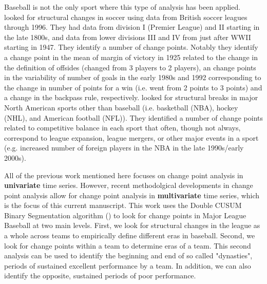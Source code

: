 \documentclass[USenglish]{article}
\theoremstyle{dgthm}
\theoremstyle{dgdef}
\begin{document}
Baseball is not the only sport where this type of analysis has been applied.  \cite{PalaciosHuerta2004} looked for structural changes in soccer using data from British soccer leagues through 1996.  They had data from division I (Premier League) and II starting in the late 1800s, and data from lower divisions III and IV from just after WWII starting in 1947.  They identify a number of change points.  Notably they identify a change point in the mean of margin of victory in 1925 related to the change in the definition of offsides (changed from 3 players to 2 players), an change points in the variability of number of goals in the early 1980s and 1992 corresponding to the change in number of points for a win (i.e. went from 2 points to 3 points) and a change in the backpass rule, respectively.  \cite{FortLee2007} looked for structural breaks in major North American sports other than baseball (i.e. basketball (NBA), hockey (NHL), and American football (NFL)).  They identified a number of change points related to competitive balance in each sport that often, though not always, correspond to league expansion, league mergers, or other major events in a sport (e.g. increased number of foreign players in the NBA in the late 1990s/early 2000s).


All of the previous work mentioned here focuses on change point analysis in {\bf univariate} time series. However, recent methodolgical developments in change point analysis allow for change point analysis in {\bf multivariate} time series, which is the focus of this current manuscript.  This work uses the Double CUSUM Binary Segmentation algorithm (\cite{Cho2016,ChoFryzlewicz2014}) to look for change points in Major League Baseball at two main levels.  First, we look for structural changes in the league as a whole across teams to empirically define different eras in baseball.  Second, we look for change points within a team to determine eras of a team.  This second analysis can be used to identify the beginning and end of so called "dynasties", periods of sustained excellent performance by a team.  In addition, we can also identify the opposite, sustained periods of poor performance.  

\end{document}
